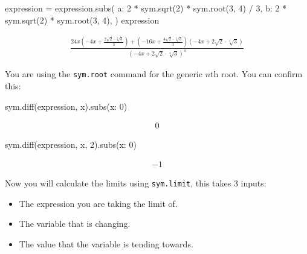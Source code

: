 \begin{pyin}
expression = expression.subs(
    {
        a: 2 * sym.sqrt(2) * sym.root(3, 4) / 3, 
        b: 2 * sym.sqrt(2) * sym.root(3, 4),
    }
)
expression
\end{pyin}




\begin{equation*}
\begin{split}\displaystyle \frac{24 x \left(- 4 x + \frac{2 \sqrt{2} \cdot \sqrt[4]{3}}{3}\right) + \left(- 16 x + \frac{4 \sqrt{2} \cdot \sqrt[4]{3}}{3}\right) \left(- 4 x + 2 \sqrt{2} \cdot \sqrt[4]{3}\right)}{\left(- 4 x + 2 \sqrt{2} \cdot \sqrt[4]{3}\right)^{4}}\end{split}
\end{equation*}

You are using the \texttt{sym.root} command for the generic \(n\)th root.
You can confirm this:




\begin{pyin}
sym.diff(expression, x).subs({x: 0})
\end{pyin}




\begin{equation*}
\begin{split}\displaystyle 0\end{split}
\end{equation*}






\begin{pyin}
sym.diff(expression, x, 2).subs({x: 0})
\end{pyin}




\begin{equation*}
\begin{split}\displaystyle -1\end{split}
\end{equation*}




Now you will calculate the limits using \texttt{sym.limit}, this takes 3 inputs:
\begin{itemize}
\item 

The expression you are taking the limit of.

\item 

The variable that is changing.

\item 

The value that the variable is tending towards.

\end{itemize}




